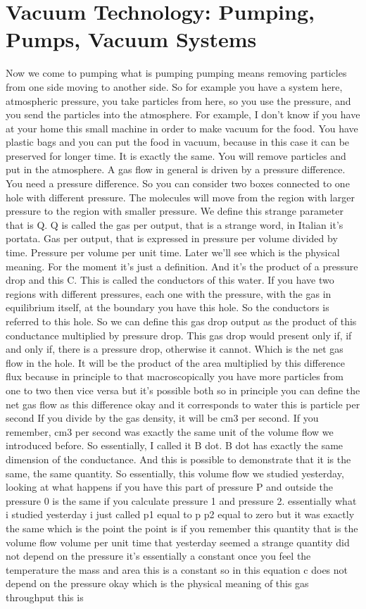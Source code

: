 \chapter{Vacuum Technology: Pumping, Pumps, Vacuum Systems}
Now we come to pumping what is pumping pumping means removing particles from one side moving to another side. So for example you have a system here, atmospheric pressure, you take particles from here, so you use the pressure, and you send the particles into the atmosphere. For example, I don't know if you have at your home this small machine in order to make vacuum for the food. You have plastic bags and you can put the food in vacuum, because in this case it can be preserved for longer time. It is exactly the same. You will remove particles and put in the atmosphere. A gas flow in general is driven by a pressure difference. You need a pressure difference. So you can consider two boxes connected to one hole with different pressure. The molecules will move from the region with larger pressure to the region with smaller pressure. We define this strange parameter that is Q. Q is called the gas per output, that is a strange word, in Italian it's portata. Gas per output, that is expressed in pressure per volume divided by time. Pressure per volume per unit time. Later we'll see which is the physical meaning. For the moment it's just a definition. And it's the product of a pressure drop and this C. This is called the conductors of this water. If you have two regions with different pressures, each one with the pressure, with the gas in equilibrium itself, at the boundary you have this hole. So the conductors is referred to this hole. So we can define this gas drop output as the product of this conductance multiplied by pressure drop. This gas drop would present only if, if and only if, there is a pressure drop, otherwise it cannot. Which is the net gas flow in the hole. It will be the product of the area multiplied by this difference flux because in principle to that macroscopically you have more particles from one to two then vice versa but it's possible both so in principle you can define the net gas flow as this difference okay and it corresponds to water this is particle per second If you divide by the gas density, it will be cm3 per second. If you remember, cm3 per second was exactly the same unit of the volume flow we introduced before. So essentially, I called it B dot. B dot has exactly the same dimension of the conductance. And this is possible to demonstrate that it is the same, the same quantity. So essentially, this volume flow we studied yesterday, looking at what happens if you have this part of pressure P and outside the pressure 0 is the same if you calculate pressure 1 and pressure 2. essentially what i studied yesterday i just called p1 equal to p p2 equal to zero but it was exactly the same which is the point the point is if you remember this quantity that is the volume flow volume per unit time that yesterday seemed a strange quantity did not depend on the pressure it's essentially a constant once you feel the temperature the mass and area this is a constant so in this equation c does not depend on the pressure okay which is the physical meaning of this gas throughput this is 